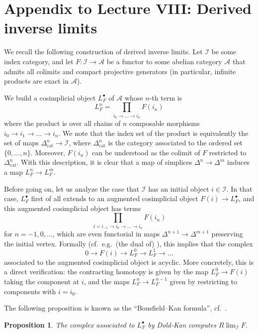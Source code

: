 \documentclass[11pt]{amsbook}
\numberwithin{equation}{section}
\numberwithin{theorem}{section}
\newtheorem{proposition}[theorem]{Proposition}
\theoremstyle{definition}
\begin{document}
\newpage

\section*{Appendix to Lecture VIII: Derived inverse limits}

We recall the following construction of derived inverse limits. Let $\mathcal I$ be some index category, and let $F: \mathcal I\to \mathcal{A}$ be a functor to some abelian category $\mathcal A$ that admits all colimits and compact projective generators (in particular, infinite products are exact in $\mathcal A$).

We build a cosimplicial object $L_F^\bullet$ of $\mathcal A$ whose $n$-th term is
\[
L_F^n = \prod_{i_0\to\ldots\to i_n} F(i_n)
\]
where the product is over all chains of $n$ composable morphisms $i_0\to i_1\to\ldots \to i_n$. We note that the index set of the product is equivalently the set of maps $\Delta^n_{\mathrm{cat}}\to \mathcal I$, where $\Delta^n_{\mathrm{cat}}$ is the category associated to the ordered set $\{0,\ldots,n\}$. Moreover, $F(i_n)$ can be understood as the colimit of $F$ restricted to $\Delta^n_{\mathrm{cat}}$. With this description, it is clear that a map of simplices $\Delta^n\to \Delta^m$ induces a map $L_F^n\to L_F^m$.

Before going on, let us analyze the case that $\mathcal I$ has an initial object $i\in \mathcal I$. In that case, $L_F^\bullet$ first of all extends to an augmented cosimplicial object $F(i)\to L_F^\bullet$, and this augmented cosimplicial object has terms
\[
\prod_{i=i_{-1}\to i_0\to \ldots\to i_n} F(i_n)
\]
for $n=-1,0,\ldots$, which are even functorial in maps $\Delta^{n+1}\to \Delta^{m+1}$ preserving the initial vertex. Formally (cf.~e.g.~(the dual of) \cite[Lemma 6.1.3.16]{LurieHTT}), this implies that the complex
\[
0\to F(i)\to L_F^0\to L_F^1\to \ldots
\]
associated to the augmented cosimplicial object is acyclic. More concretely, this is a direct verification: the contracting homotopy is given by the map $L_F^0\to F(i)$ taking the component at $i$, and the maps $L_F^n\to L_F^{n-1}$ given by restricting to components with $i=i_0$.

The following proposition is known as the ``Bousfield--Kan formula'', cf.~\cite[Chapter XI]{BousfieldKan}.

\begin{proposition} The complex associated to $L_F^\bullet$ by Dold-Kan computes $R\lim_{\mathcal I} F$.
\end{proposition}
\end{document}

